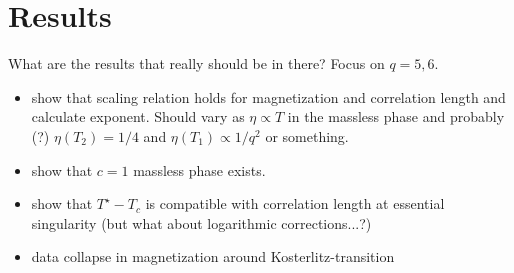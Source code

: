 \section{Results}

What are the results that really should be in there? Focus on $q = 5, 6$.

\begin{itemize}
  \item show that scaling relation holds for magnetization and correlation length and calculate exponent. Should vary as
  $\eta \propto T$ in the massless phase and probably (?) $\eta(T_2) = 1/4$ and $\eta(T_1) \propto 1/q^2$ or something.
  \item show that $c = 1$ massless phase exists.
  \item show that $T^{\star} - T_c$ is compatible with correlation length at essential singularity (but what about
  logarithmic corrections...?)
  \item data collapse in magnetization around Kosterlitz-transition
\end{itemize}
